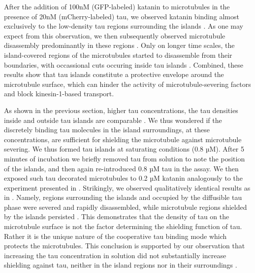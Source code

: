 After the addition of 100nM (GFP-labeled) katanin to microtubules in the presence of 20nM (mCherry-labeled) tau, we observed katanin binding almost exclusively to the low-density tau regions surrounding the islands . As one may expect from this observation, we then subsequently observed microtubule disassembly predominantly in these regions . Only on longer time scales, the island-covered regions of the microtubules started to disassemble from their boundaries, with occassional cuts occuring inside tau islands . Combined, these results show that tau islands constitute a protective envelope around the microtubule surface, which can hinder the activity of microtubule-severing factors and block kinesin-1-based transport. \par

As shown in the previous section, higher tau concentrations, the tau densities inside and outside tau islands are comparable . We thus wondered if the discretely binding tau molecules in the island surroundings, at these concentrations, are sufficient for shielding the microtubule against microtubule severing. We thus formed tau islands at saturating conditions (0.8 µM). After 5 minutes of incubation we briefly removed tau from solution to note the position of the islands, and then again re-introduced 0.8 µM tau in the assay. We then exposed such tau decorated microtubules to 0.2 µM katanin analogously to the experiment presented in . Strikingly, we observed qualitatively identical results as in . Namely, regions surrounding the islands and occupied by the diffusible tau phase were severed and rapidly disassembled, while microtubule regions shielded by the islands persisted . This demonstrates that the density of tau on the microtubule surface is not the factor determining the shielding function of tau. Rather it is the unique nature of the cooperative tau binding mode which protects the microtubules. This conclusion is supported by our observation that increasing the tau concentration in solution did not substantially increase shielding against tau, neither in the island regions  nor in their surroundings .\par

